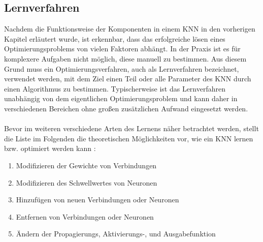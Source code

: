 \subsection{Lernverfahren}
\label{subsec:optimization_strategies}
Nachdem die Funktionsweise der Komponenten in einem \ac{KNN} in den vorherigen Kapitel erläutert wurde, ist erkennbar, dass das erfolgreiche lösen eines Optimierungsproblems von vielen Faktoren abhängt. In der Praxis ist es für komplexere Aufgaben nicht möglich, diese manuell zu bestimmen. Aus diesem Grund muss ein Optimierungsverfahren, auch als Lernverfahren bezeichnet, verwendet werden, mit dem Ziel einen Teil oder alle Parameter des \ac{KNN} durch einen Algorithmus zu bestimmen. Typischerweise ist das Lernverfahren unabhängig von dem eigentlichen Optimierungsproblem und kann daher in verschiedenen Bereichen ohne großen zusätzlichen Aufwand eingesetzt werden.\\\\
Bevor im weiteren verschiedene Arten des Lernens näher betrachtet werden, stellt die Liste im Folgenden die theoretischen Möglichkeiten vor, wie ein \ac{KNN} lernen bzw. optimiert werden kann \cite{zell2003simulation}:
\begin{enumerate}
	\item Modifizieren der Gewichte von Verbindungen
	\item Modifizieren des Schwellwertes von Neuronen
	\item Hinzufügen von neuen Verbindungen oder Neuronen
	\item Entfernen von Verbindungen oder Neuronen
	\item Ändern der Propagierungs, Aktivierungs-, und Ausgabefunktion
\end{enumerate}
